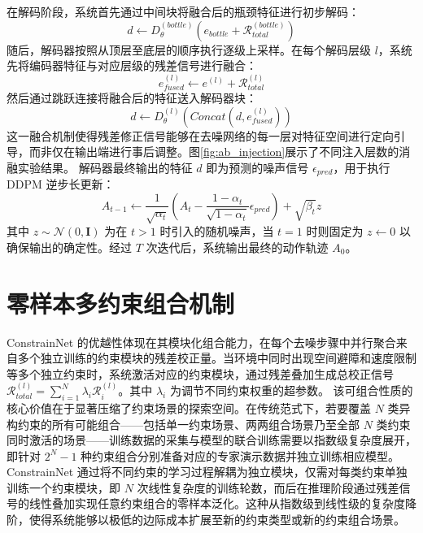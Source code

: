 在解码阶段，系统首先通过中间块将融合后的瓶颈特征进行初步解码：
\begin{equation}
d \leftarrow D_{\theta}^{(bottle)}(e_{bottle} + \mathcal{R}_{total}^{(bottle)})
\end{equation}
随后，解码器按照从顶层至底层的顺序执行逐级上采样。在每个解码层级 $l$，系统先将编码器特征与对应层级的残差信号进行融合：
\begin{equation}
e_{fused}^{(l)} \leftarrow e^{(l)} + \mathcal{R}_{total}^{(l)}
\end{equation}
然后通过跳跃连接将融合后的特征送入解码器块：
\begin{equation}
d \leftarrow D_{\theta}^{(l)}(Concat(d, e_{fused}^{(l)}))
\end{equation}
这一融合机制使得残差修正信号能够在去噪网络的每一层对特征空间进行定向引导，而非仅在输出端进行事后调整。图\ref{fig:ab_injection}展示了不同注入层数的消融实验结果。
解码器最终输出的特征 $d$ 即为预测的噪声信号 $\epsilon_{pred}$，用于执行 DDPM 逆步长更新：
\begin{equation}
A_{t-1} \leftarrow \frac{1}{\sqrt{\alpha_{t}}}\left(A_{t} - \frac{1-\alpha_{t}}{\sqrt{1-\alpha_{t}}}\epsilon_{pred}\right) + \sqrt{\beta_{t}}z
\end{equation}
其中 $z \sim \mathcal{N}(0, \mathbf{I})$ 为在 $t > 1$ 时引入的随机噪声，当 $t = 1$ 时则固定为 $z \leftarrow 0$ 以确保输出的确定性。经过 $T$ 次迭代后，系统输出最终的动作轨迹 $A_{0}$。

\section{零样本多约束组合机制}
ConstrainNet 的优越性体现在其模块化组合能力，在每个去噪步骤中并行聚合来自多个独立训练的约束模块的残差校正量。当环境中同时出现空间避障和速度限制等多个独立约束时，系统激活对应的约束模块，通过残差叠加生成总校正信号 $\mathcal{R}_{total}^{(l)}=\sum_{i=1}^{N}\lambda_{i}\mathcal{R}_{i}^{(l)}$。其中 $\lambda_{i}$ 为调节不同约束权重的超参数。
该可组合性质的核心价值在于显著压缩了约束场景的探索空间。在传统范式下，若要覆盖 $N$ 类异构约束的所有可能组合——包括单一约束场景、两两组合场景乃至全部 $N$ 类约束同时激活的场景——训练数据的采集与模型的联合训练需要以指数级复杂度展开，即针对 $2^{N}-1$ 种约束组合分别准备对应的专家演示数据并独立训练相应模型。ConstrainNet 通过将不同约束的学习过程解耦为独立模块，仅需对每类约束单独训练一个约束模块，即 $N$ 次线性复杂度的训练轮数，而后在推理阶段通过残差信号的线性叠加实现任意约束组合的零样本泛化。这种从指数级到线性级的复杂度降阶，使得系统能够以极低的边际成本扩展至新的约束类型或新的约束组合场景。

